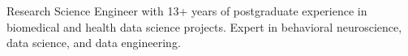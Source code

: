 

\begin{cvparagraph}

 Research Science Engineer with 13+ years of postgraduate experience in biomedical and health data science projects. Expert in behavioral neuroscience, data science, and data engineering.
\end{cvparagraph}
